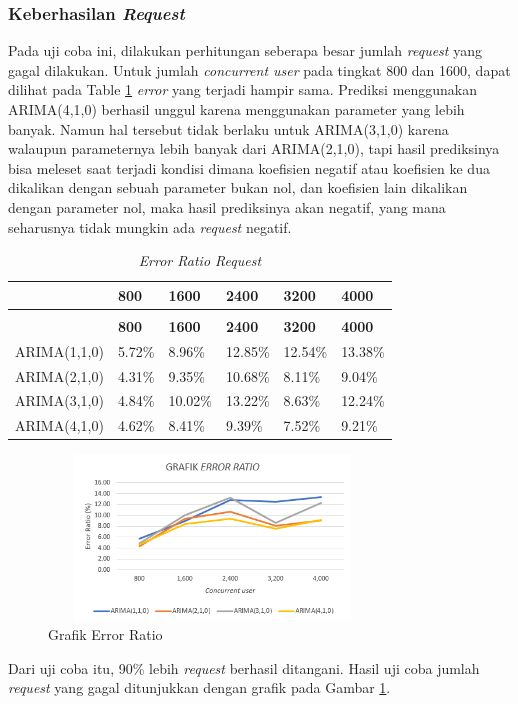         \subsubsection{Keberhasilan \textit{Request}}
        	Pada uji coba ini, dilakukan perhitungan seberapa besar jumlah \textit{request} yang gagal dilakukan. Untuk jumlah \textit{concurrent user} pada tingkat 800 dan 1600, dapat dilihat pada Table \ref{keberhasilanrequest} \textit{error} yang terjadi hampir sama. Prediksi menggunakan ARIMA(4,1,0) berhasil unggul karena menggunakan parameter yang lebih banyak. Namun hal tersebut tidak berlaku untuk ARIMA(3,1,0) karena walaupun parameternya lebih banyak dari ARIMA(2,1,0), tapi hasil prediksinya bisa meleset saat terjadi kondisi dimana koefisien negatif atau koefisien ke dua dikalikan dengan sebuah parameter bukan nol, dan koefisien lain dikalikan dengan parameter nol, maka hasil prediksinya akan negatif, yang mana seharusnya tidak mungkin ada \textit{request} negatif.
            \begin{longtable}{|p{}|p{}|p{}|p{}|p{}|p{}|}
        \caption{\textit{Error Ratio Request}} \label{keberhasilanrequest} \\
            \hline
            & \textbf{800} & \textbf{1600} & \textbf{2400} & \textbf{3200} & \textbf{4000} \\ \hline
            \endfirsthead
            \caption[]{\textit{Error Ratio Request}} \\
            \hline
            & \textbf{800} & \textbf{1600} & \textbf{2400} & \textbf{3200} & \textbf{4000} \\ \hline
            \endhead
            \endfoot
            \endlastfoot
			
            ARIMA(1,1,0) & 5.72\% & 8.96\% & 12.85\% & 12.54\% & 13.38\% \\ \hline
            ARIMA(2,1,0) & 4.31\% & 9.35\% & 10.68\% & 8.11\% & 9.04\% \\ \hline
            ARIMA(3,1,0) & 4.84\% & 10.02\% & 13.22\% & 8.63\% & 12.24\% \\ \hline
            ARIMA(4,1,0) & 4.62\% & 8.41\% & 9.39\% & 7.52\% & 9.21\% \\ \hline
		\end{longtable}
            
    		\begin{figure}[H]
				\centering
				\includegraphics[width=8.7cm,height=4.4cm]{Images/C-5/errorratio.png}
				\caption{Grafik Error Ratio}
				\label{gerrorratio}
			\end{figure}
            Dari uji coba itu, 90\% lebih \textit{request} berhasil ditangani. Hasil uji coba jumlah \textit{request} yang gagal ditunjukkan dengan grafik pada Gambar \ref{gerrorratio}.